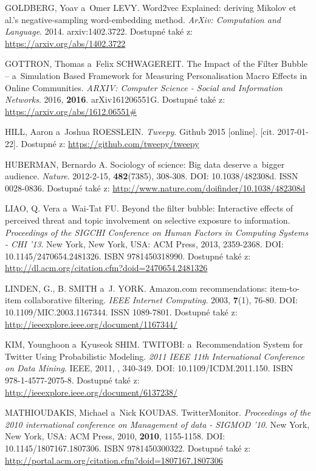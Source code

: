 \documentclass[12pt, a4paper]{article}
\numberwithin{equation}{section} 	%
\begin{document}
\begin{thebibliography}{99}
    GOLDBERG, Yoav a~Omer LEVY. Word2vec Explained: deriving Mikolov et al.'s negative-sampling word-embedding method. \textit{ArXiv: Computation and Language}. 2014. arxiv:1402.3722. Dostupné také z: \url{https://arxiv.org/abs/1402.3722}

    GOTTRON, Thomas a~Felix SCHWAGEREIT. The Impact of the Filter Bubble -- a~Simulation Based Framework for Measuring Personalisation Macro Effects in Online Communities. \textit{ARXIV: Computer Science - Social and Information Networks}. 2016, \textbf{2016}. arXiv161206551G. Dostupné také z: \url{https://arxiv.org/abs/1612.06551\#}

    HILL, Aaron a~Joshua ROESSLEIN. \textit{Tweepy}. Github 2015 [online]. [cit. 2017-01-22]. Dostupné z: \url{https://github.com/tweepy/tweepy}

    HUBERMAN, Bernardo A. Sociology of science: Big data deserve a~bigger audience. \textit{Nature}. 2012-2-15, \textbf{482}(7385), 308-308. DOI: 10.1038/482308d. ISSN 0028-0836. Dostupné také z: \url{http://www.nature.com/doifinder/10.1038/482308d}

    LIAO, Q. Vera a~Wai-Tat FU. Beyond the filter bubble: Interactive effects of perceived threat and topic involvement on selective exposure to information. \textit{Proceedings of the SIGCHI Conference on Human Factors in Computing Systems - CHI '13}. New York, New York, USA: ACM Press, 2013, 2359-2368. DOI: 10.1145/2470654.2481326. ISBN 9781450318990. Dostupné také z: \url{http://dl.acm.org/citation.cfm?doid=2470654.2481326}

    LINDEN, G., B. SMITH a~J. YORK. Amazon.com recommendations: item-to-item collaborative filtering. \textit{IEEE Internet Computing}. 2003, \textbf{7}(1), 76-80. DOI: 10.1109/MIC.2003.1167344. ISSN 1089-7801. Dostupné také z: \url{http://ieeexplore.ieee.org/document/1167344/}

    KIM, Younghoon a~Kyuseok SHIM. TWITOBI: a~Recommendation System for Twitter Using Probabilistic Modeling. \textit{2011 IEEE 11th International Conference on Data Mining}. IEEE, 2011, , 340-349. DOI: 10.1109/ICDM.2011.150. ISBN 978-1-4577-2075-8. Dostupné také z: \url{http://ieeexplore.ieee.org/document/6137238/}

    MATHIOUDAKIS, Michael a~Nick KOUDAS. TwitterMonitor. \textit{Proceedings of the 2010 international conference on Management of data - SIGMOD '10}. New York, New York, USA: ACM Press, 2010, \textbf{2010}, 1155-1158. DOI: 10.1145/1807167.1807306. ISBN 9781450300322. Dostupné také z: \url{http://portal.acm.org/citation.cfm?doid=1807167.1807306}


\end{thebibliography}
\end{document}
